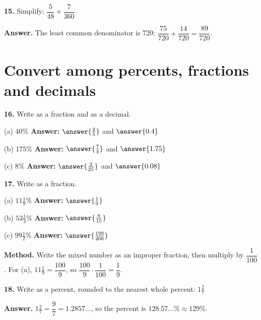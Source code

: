 \documentclass{ximera}
\begin{document}
\begin{problem}
\textbf{15.} Simplify: $\dfrac{5}{48}+\dfrac{7}{360}$

\begin{hint}
\textbf{Answer.} The least common denominator is 720:
$\dfrac{75}{720}+\dfrac{14}{720}=\dfrac{89}{720}$.
\end{hint}
\end{problem}

\section*{Convert among percents, fractions and decimals}

\begin{problem}
\textbf{16.} Write as a fraction and as a decimal.

(a) $40\%$ \qquad \textbf{Answer:} $\answer{\frac{2}{5}}$ and $\answer{0.4}$

(b) $175\%$ \qquad \textbf{Answer:} $\answer{\frac{7}{4}}$ and $\answer{1.75}$

(c) $8\%$ \qquad \textbf{Answer:} $\answer{\frac{2}{25}}$ and $\answer{0.08}$
\end{problem}

\begin{problem}
\textbf{17.} Write as a fraction.

(a) $11\frac{1}{9}\%$ \qquad \textbf{Answer:} $\answer{\frac{1}{9}}$

(b) $53\frac{1}{3}\%$ \qquad \textbf{Answer:} $\answer{\frac{8}{15}}$

(c) $99\frac{1}{2}\%$ \qquad \textbf{Answer:} $\answer{\frac{199}{200}}$

\begin{hint}
\textbf{Method.} Write the mixed number as an improper fraction, then multiply by
$\dfrac{1}{100}$. For (a), $11\frac{1}{9}=\dfrac{100}{9}$, so
$\dfrac{100}{9}\cdot\dfrac{1}{100}=\dfrac{1}{9}$.
\end{hint}
\end{problem}

\begin{problem}
\textbf{18.} Write as a percent, rounded to the nearest whole percent:
$1\frac{2}{7}$

\begin{hint}
\textbf{Answer.} $1\frac{2}{7}=\dfrac{9}{7}=1.2857\ldots$, so the percent is
$128.57\ldots\% \approx 129\%$.
\end{hint}
\end{problem}
\end{document}
